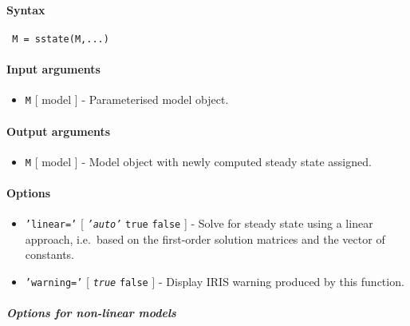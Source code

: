 


	\paragraph{Syntax}
 
 \begin{verbatim}
 M = sstate(M,...)
 \end{verbatim}
 
 \paragraph{Input arguments}
 
 \begin{itemize}
 \item
   \texttt{M} {[} model {]} - Parameterised model object.
 \end{itemize}
 
 \paragraph{Output arguments}
 
 \begin{itemize}
 \item
   \texttt{M} {[} model {]} - Model object with newly computed steady
   state assigned.
 \end{itemize}
 
 \paragraph{Options}
 
 \begin{itemize}
 \item
   \texttt{'linear='} {[} \emph{\texttt{'auto'}} \textbar{} \texttt{true}
   \textbar{} \texttt{false} {]} - Solve for steady state using a linear
   approach, i.e.~based on the first-order solution matrices and the
   vector of constants.
 \item
   \texttt{'warning='} {[} \emph{\texttt{true}} \textbar{} \texttt{false}
   {]} - Display IRIS warning produced by this function.
 \end{itemize}
 
 \subparagraph{Options for non-linear models}
 
